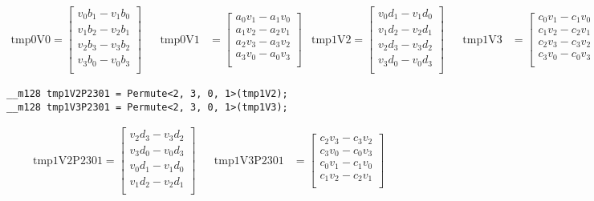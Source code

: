 \documentclass[]{scrartcl}
\begin{document}
\begin{align*}
\mathrm{tmp0V0} 
=
\begin{bmatrix}
v_0b_1 - v_1b_0\\
v_1b_2 - v_2b_1\\
v_2b_3 - v_3b_2\\
v_3b_0 - v_0b_3\\
\end{bmatrix}
&&
\mathrm{tmp0V1} 
&=
\begin{bmatrix}
a_0v_1 - a_1v_0\\
a_1v_2 - a_2v_1\\
a_2v_3 - a_3v_2\\
a_3v_0 - a_0v_3\\
\end{bmatrix}
&
\mathrm{tmp1V2} 
=
\begin{bmatrix}
v_0d_1 - v_1d_0\\
v_1d_2 - v_2d_1\\
v_2d_3 - v_3d_2\\
v_3d_0 - v_0d_3\\
\end{bmatrix}
&&
\mathrm{tmp1V3} 
&=
\begin{bmatrix}
c_0v_1 - c_1v_0\\
c_1v_2 - c_2v_1\\
c_2v_3 - c_3v_2\\
c_3v_0 - c_0v_3\\
\end{bmatrix}
\end{align*}

\begin{verbatim}
__m128 tmp1V2P2301 = Permute<2, 3, 0, 1>(tmp1V2);
__m128 tmp1V3P2301 = Permute<2, 3, 0, 1>(tmp1V3);
\end{verbatim}

\begin{align*}
\mathrm{tmp1V2P2301} 
=
\begin{bmatrix}
v_2d_3 - v_3d_2\\
v_3d_0 - v_0d_3\\
v_0d_1 - v_1d_0\\
v_1d_2 - v_2d_1\\
\end{bmatrix}
&&
\mathrm{tmp1V3P2301} 
&=
\begin{bmatrix}
c_2v_3 - c_3v_2\\
c_3v_0 - c_0v_3\\
c_0v_1 - c_1v_0\\
c_1v_2 - c_2v_1\\
\end{bmatrix}
\end{align*}
\end{document}
